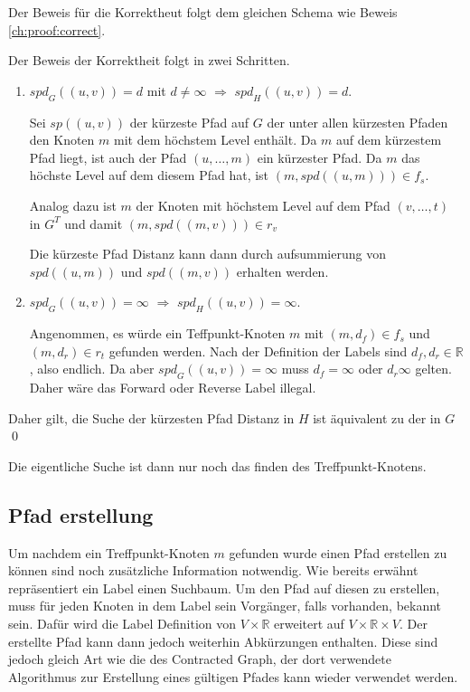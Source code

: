 Der Beweis für die Korrektheut folgt dem gleichen Schema wie Beweis \ref{ch:proof:correct}.

\begin{beweis}\label{hl:proof:correct}
    Der Beweis der Korrektheit folgt in zwei Schritten.

    \begin{enumerate}
        \item
              ${spd}_G ((u, v)) = d$ mit $d \neq \infty$ $\Rightarrow$ ${spd}_H((u, v)) = d$.

              Sei ${sp}((u, v))$ der kürzeste Pfad auf $G$ der unter allen kürzesten Pfaden den Knoten $m$ mit dem höchstem Level enthält.
              Da $m$ auf dem kürzestem Pfad liegt, ist auch der Pfad $(u, \dotsc, m)$ ein kürzester Pfad.
              Da $m$ das höchste Level auf dem diesem Pfad hat, ist $(m, {spd}((u, m))) \in f_s$.

              Analog dazu ist $m$ der Knoten mit höchstem Level auf dem Pfad $(v, \dotsc, t)$ in $G^T$ und damit $(m, {spd}((m, v))) \in r_v$

              Die kürzeste Pfad Distanz kann dann durch aufsummierung von ${spd}((u, m))$ und ${spd}((m, v))$ erhalten werden.

        \item
              ${spd}_G ((u, v)) = \infty$ $\Rightarrow$ ${spd}_H((u, v)) = \infty$.

              Angenommen, es würde ein Teffpunkt-Knoten $m$ mit $(m, d_f) \in f_s$ und $(m, d_r) \in r_t$ gefunden werden.
              Nach der Definition der Labels sind $d_f, d_r \in \mathbb{R}$, also endlich.
              Da aber ${spd}_G ((u, v)) = \infty$ muss $d_f = \infty$ oder $d_r \infty$ gelten.
              Daher wäre das Forward oder Reverse Label illegal.
    \end{enumerate}

    Daher gilt, die Suche der kürzesten Pfad Distanz in $H$ ist äquivalent zu der in $G$
    \qed
\end{beweis}

Die eigentliche Suche ist dann nur noch das finden des Treffpunkt-Knotens.


\subsection{Pfad erstellung}

Um nachdem ein Treffpunkt-Knoten $m$ gefunden wurde einen Pfad erstellen zu können sind noch zusätzliche Information notwendig.
Wie bereits erwähnt repräsentiert ein Label einen Suchbaum.
Um den Pfad auf diesen zu erstellen, muss für jeden Knoten in dem Label sein Vorgänger, falls vorhanden, bekannt sein.
Dafür wird die Label Definition von $V \times \mathbb{R}$ erweitert auf $V \times \mathbb{R} \times V$.
Der erstellte Pfad kann dann jedoch weiterhin Abkürzungen enthalten.
Diese sind jedoch gleich Art wie die des Contracted Graph, der dort verwendete Algorithmus zur Erstellung eines gültigen Pfades kann wieder verwendet werden.


